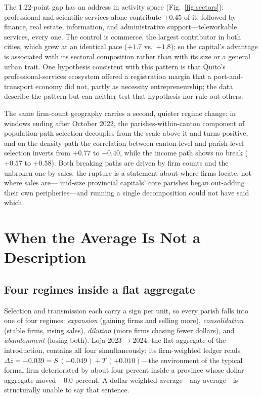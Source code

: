 \documentclass[conference]{IEEEtran}
\begin{document}
The 1.22-point gap has an address in activity space
(Fig.~\ref{fig:sectors}): professional and scientific services alone
contribute $+0.45$ of it, followed by finance, real estate, information,
and administrative support---teleworkable services, every one. The
control is commerce, the largest contributor in both cities, which grew
at an identical pace ($+1.7$ vs.\ $+1.8$); so the capital's advantage is
associated with its sectoral composition rather than with its size or a
general urban trait. One hypothesis consistent with this pattern is that
Quito's professional-services ecosystem offered a registration margin
that a port-and-transport economy did not, partly as necessity
entrepreneurship; the data describe the pattern but can neither test
that hypothesis nor rule out others.

The same firm-count geography carries a second, quieter regime change:
in windows ending after October 2022, the parishes-within-canton
component of population-path selection decouples from the scale above it
and turns positive, and on the density path the correlation between
canton-level and parish-level selection inverts from $+0.77$ to $-0.40$,
while the income path shows no break ($+0.57$ to $+0.58$). Both breaking
paths are driven by firm counts and the unbroken one by sales: the
rupture is a statement about where firms locate, not where sales are---
mid-size provincial capitals' core parishes began out-adding their own
peripheries---and running a single decomposition could not have said
which.

\section{When the Average Is Not a Description}

\subsection{Four regimes inside a flat aggregate}

Selection and transmission each carry a sign per unit, so every parish
falls into one of four regimes: \textit{expansion} (gaining firms and
selling more), \textit{consolidation} (stable firms, rising sales),
\textit{dilution} (more firms chasing fewer dollars), and \textit{abandonment} (losing both). Loja 2023$\to$2024,
the flat aggregate of the introduction, contains all four
simultaneously: its firm-weighted ledger reads
$\Delta \bar z = -0.039 = S\,(-0.049) + T\,(+0.010)$---the environment of
the typical formal firm deteriorated by about four percent inside a
province whose dollar aggregate moved $+0.0$ percent. A dollar-weighted
average---any average---is structurally unable to say that sentence.
\end{document}
